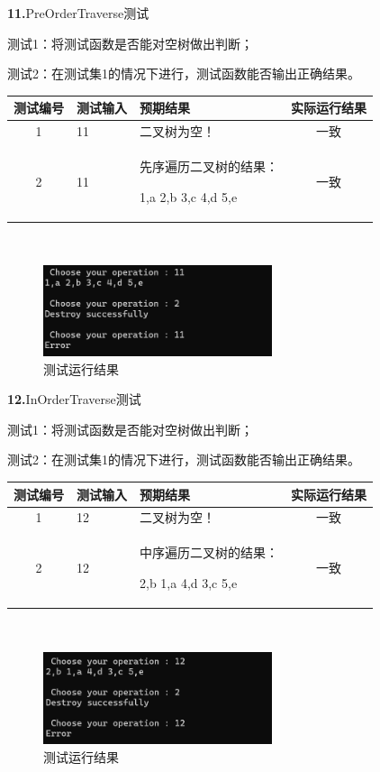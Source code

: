 \documentclass[supercite]{Experimental_Report}
\theoremstyle{definition}
\begin{document}
\noindent\textbf{11.}PreOrderTraverse测试

测试1：将测试函数是否能对空树做出判断；

测试2：在测试集1的情况下进行，测试函数能否输出正确结果。

\vspace{0.5em}

\begin{tabular}{|c|p{2.7cm}|p{4.5cm}|c|}
	\hline
	测试编号 & 测试输入 & 预期结果 & 实际运行结果 \\
	\hline
	1 & 11 & 二叉树为空！ & 一致 \\
	\hline
	2 & 11 & 先序遍历二叉树的结果：
 
1,a 2,b 3,c 4,d 5,e & 一致 \\
	\hline
\end{tabular}

~\

\begin{figure}[H]
 	\centering
 	\includegraphics[width=0.6\textwidth]{images/二叉树测试11.png}
 	\caption{测试运行结果}
 	\label{txlab}
 \end{figure}

\noindent\textbf{12.}InOrderTraverse测试

测试1：将测试函数是否能对空树做出判断；

测试2：在测试集1的情况下进行，测试函数能否输出正确结果。

\vspace{0.5em}

\begin{tabular}{|c|p{2.7cm}|p{4.5cm}|c|}
	\hline
	测试编号 & 测试输入 & 预期结果 & 实际运行结果 \\
	\hline
	1 & 12 & 二叉树为空！ & 一致 \\
	\hline
	2 & 12 & 中序遍历二叉树的结果：
 
2,b 1,a 4,d 3,c 5,e & 一致 \\
	\hline
\end{tabular}

~\

\begin{figure}[H]
 	\centering
 	\includegraphics[width=0.6\textwidth]{images/二叉树测试12.png}
 	\caption{测试运行结果}
 	\label{txlab}
 \end{figure}
\end{document}
